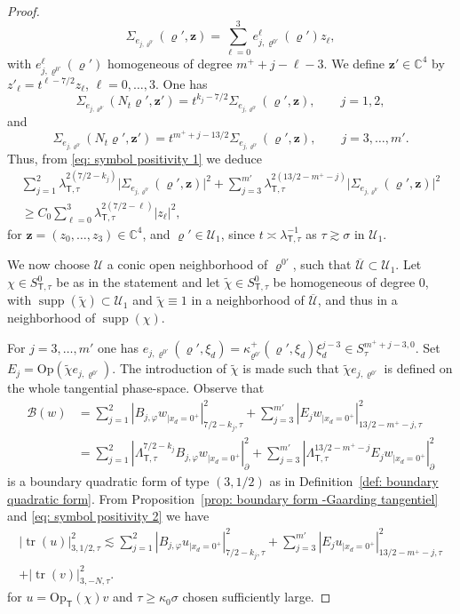 \documentclass[10pt]{amsart}
\theoremstyle{plain}
\theoremstyle{definition}
\def\C{\mathbb{C}}
\newcommand{\nhd}{neighborhood\xspace}
\newcommand{\suff}{sufficiently\xspace}
\let\k\kappa
\let\y\varrho
\newcommand{\tchi}{\tilde{\chi}}
\newcommand{\ovl}[1]{\overline{#1}}
\newcommand{\un}[1]{\Sigma_{#1}}
\newcommand{\U}{\mathscr U}
\newcommand{\z}{\boldsymbol{z}}
\newcommand{\br}{\ensuremath{_{|x_d=0^+}}}
\newcommand{\Op}{\ensuremath{\mathrm{Op}}}
\newcommand{\Opt}{\ensuremath{\mathrm{Op}_{\scriptscriptstyle{\mathsf{T}}}}}
\newcommand{\norm}[2]{{|#1|}_{#2}}
\newcommand{\normsc}[2]{{| #1 |}_{#2, \tau}}
\newcommand{\lsct}{\lambda_{{\scriptscriptstyle{\mathsf T}},\tau}}
\newcommand{\Lsct}{\Lambda_{{\scriptscriptstyle{\mathsf T}},\tau}}
\newcommand{\Ssc}{S_\tau}
\newcommand{\Ssct}{S_{{\scriptscriptstyle{\mathsf T}},\tau}}
\DeclareMathOperator{\supp}{supp}
\DeclareMathOperator{\trace}{tr}
\begin{document}
\begin{proof}
\begin{equation*}
\un{e_{j, \y^{0\prime}}} (\y', \z)= \sum_{\ell=0}^{3} e_{j,
\y^{0\prime}}^\ell (\y') z_\ell,
\end{equation*}
with $ e_{j, \y^{0\prime}}^\ell (\y')$ homogeneous of degree
$m^++j-\ell-3$.
We define $\z' \in \C^4$ by $z'_\ell = t^{\ell-7/2} z_\ell$, $\ell=0,
\dots, 3$.
One has
\begin{equation*}
\un{e_{j, \y^{0\prime}}} (N_t \y', \z')= t^{k_j-7/2} \un{e_{j,
\y^{0\prime}}} (\y', \z), \qquad j=1,2,
\end{equation*}
and
\begin{equation*}
\un{e_{j, \y^{0\prime}}} (N_t \y', \z')= t^{m^++j-13/2} \un{e_{j,
\y^{0\prime}}} (\y', \z), \qquad j=3,\dots,m'.
\end{equation*}
Thus, from \eqref{eq: symbol positivity 1} we deduce
\begin{multline}
\label{eq: symbol positivity 2}
\sum_{j=1}^{2} \lsct^{2(7/2-k_j)} \big|\un{e_{j, \y^{0\prime}}} (\y', \z)\big|^2
+ \sum_{j=3}^{m'} \lsct^{2(13/2-m^+-j)}
\big|\un{e_{j,\y^{0\prime}}} (\y', \z)\big|^2
\\[-10pt]
\geq
C_0 \sum_{\ell=0}^{3} \lsct^{2(7/2-\ell)}| z_\ell|^2,
\end{multline}
for $\z = (z_0, \dots, z_3) \in \C^{4}$, and $\y' \in \U_1$,
since $t \asymp \lsct^{-1}$ as $\tau \gtrsim \sigma$ in $\U_1$.

We now choose $\U$ a conic open neighborhood of $\y^{0\prime}$, such that
$\ovl{\U}\subset\U_1$. Let $\chi\in \Ssct^0$ be as in the statement and let $\tchi\in
\Ssct^0$ be homogeneous of degree $0$, with
$\supp(\tchi)\subset\U_1$ and $\tchi\equiv 1$ in a neighborhood of
$\ovl{\U}$, and thus in a \nhd of $\supp(\chi)$.

For $j=3, \dots, m'$ one has $e_{j, \y^{0\prime}}(\y',\xi_d) =
\k^+_{\y^{0\prime}} (\y',\xi_d) \xi_d^{j-3} \in \Ssc^{m^++j-3,0}$.
Set $E_{j} = \Op (\tchi e_{j, \y^{0\prime}})$. The introduction
of $\tchi$ is made such that $\tchi e_{j, \y^{0\prime}}$ is defined on
the whole tangential phase-space. Observe that
\begin{align*}
\mathscr B (w) &= \sum_{j=1}^{2} \normsc{B_{j, \varphi}w\br}{7/2-k_{j}}^2
+\sum_{j=3}^{m'} \normsc{E_{j}w\br}{13/2-m^+-j}^2\\
&=\sum_{j=1}^{2}
\norm{\Lsct^{7/2-k_{j}} B_{j, \varphi}w\br}{\partial}^2
+ \sum_{j=3}^{m'}
\norm{\Lsct^{13/2-m^+-j} E_{j}w\br}{\partial}^2
\end{align*}
is a boundary quadratic form of type $(3,1/2)$ as in
Definition~\ref{def: boundary quadratic form}.
From Proposition~\ref{prop: boundary form -Gaarding tangentiel} and
\eqref{eq: symbol positivity 2} we have
\begin{multline}
\label{eq: boundary inequality - est traces}
\normsc{\trace(u)}{3,1/2}^2
\lesssim \sum_{j=1}^{2} \normsc{B_{j, \varphi}u\br}{7/2-k_{j}}^2
+\sum_{j=3}^{m'} \normsc{E_{j}u\br}{13/2-m^+-j}^2\\
+ \normsc{\trace(v)}{3,-N}^2.
\end{multline}
for $u = \Opt(\chi) v$ and $\tau \geq \k_0 \sigma$ chosen \suff
large.


\end{proof}
\end{document}
